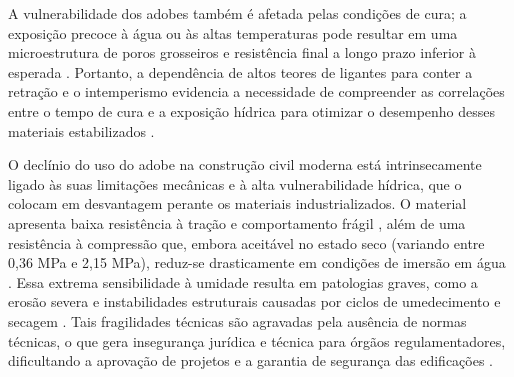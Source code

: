 A vulnerabilidade dos adobes também é afetada pelas condições de cura; a exposição precoce à água ou às altas temperaturas pode resultar em uma microestrutura de poros grosseiros e resistência final a longo prazo inferior à esperada
\cite{AlGburi2025, Wang2022, Lu2019}. Portanto, a dependência de altos teores de ligantes para conter a retração e o intemperismo evidencia a necessidade de compreender as correlações entre o tempo de cura e a exposição hídrica para otimizar o desempenho desses materiais estabilizados \cite{Zhang2025}.


O declínio do uso do adobe na construção civil moderna está intrinsecamente ligado às suas limitações mecânicas e à alta vulnerabilidade hídrica, que o colocam em desvantagem perante os materiais industrializados. O material apresenta baixa resistência à tração e comportamento frágil \cite{Brito2023, Fages2022}, além de uma resistência à compressão que, embora aceitável no estado seco (variando entre 0,36 MPa e 2,15 MPa), reduz-se drasticamente em condições de imersão em água \cite{Kafodya2019, Khunaprapakorn2025, Dao2018}. Essa extrema sensibilidade à umidade resulta em patologias graves, como a erosão severa e instabilidades estruturais causadas por ciclos de umedecimento e secagem \cite{Day1993, Sharma2016}. Tais fragilidades técnicas são agravadas pela ausência de normas técnicas, o que gera insegurança jurídica e técnica para órgãos regulamentadores, dificultando a aprovação de projetos e a garantia de segurança das edificações \cite{Fages2022, Martins2018, Morel2021, Victor2025}.

